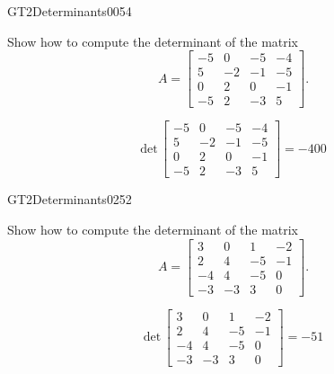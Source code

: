 \begin{exercise}{GT2}{Determinants}{0054} 
\begin{exerciseStatement} 

Show how to compute the determinant of the matrix \[A=\left[\begin{array}{cccc}
-5 & 0 & -5 & -4 \\
5 & -2 & -1 & -5 \\
0 & 2 & 0 & -1 \\
-5 & 2 & -3 & 5
\end{array}\right].\]

 \end{exerciseStatement}
 \begin{exerciseAnswer} \[\mathrm{det}\,\left[\begin{array}{cccc}
-5 & 0 & -5 & -4 \\
5 & -2 & -1 & -5 \\
0 & 2 & 0 & -1 \\
-5 & 2 & -3 & 5
\end{array}\right]=-400\] \end{exerciseAnswer}
 \end{exercise}



\begin{exercise}{GT2}{Determinants}{0252} 
\begin{exerciseStatement} 

Show how to compute the determinant of the matrix \[A=\left[\begin{array}{cccc}
3 & 0 & 1 & -2 \\
2 & 4 & -5 & -1 \\
-4 & 4 & -5 & 0 \\
-3 & -3 & 3 & 0
\end{array}\right].\]

 \end{exerciseStatement}
 \begin{exerciseAnswer} \[\mathrm{det}\,\left[\begin{array}{cccc}
3 & 0 & 1 & -2 \\
2 & 4 & -5 & -1 \\
-4 & 4 & -5 & 0 \\
-3 & -3 & 3 & 0
\end{array}\right]=-51\] \end{exerciseAnswer}
 \end{exercise}


\newpage




